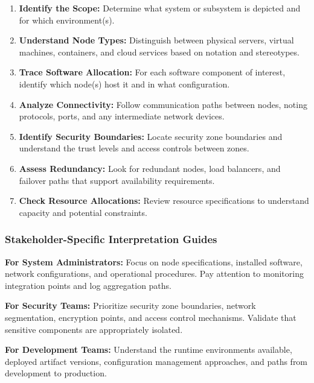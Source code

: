 \documentclass[11pt,letterpaper]{article}
\begin{document}
\begin{enumerate}
    \item \textbf{Identify the Scope:} Determine what system or subsystem is depicted and for which environment(s).
    
    \item \textbf{Understand Node Types:} Distinguish between physical servers, virtual machines, containers, and cloud services based on notation and stereotypes.
    
    \item \textbf{Trace Software Allocation:} For each software component of interest, identify which node(s) host it and in what configuration.
    
    \item \textbf{Analyze Connectivity:} Follow communication paths between nodes, noting protocols, ports, and any intermediate network devices.
    
    \item \textbf{Identify Security Boundaries:} Locate security zone boundaries and understand the trust levels and access controls between zones.
    
    \item \textbf{Assess Redundancy:} Look for redundant nodes, load balancers, and failover paths that support availability requirements.
    
    \item \textbf{Check Resource Allocations:} Review resource specifications to understand capacity and potential constraints.
\end{enumerate}

\subsubsection{Stakeholder-Specific Interpretation Guides}

\textbf{For System Administrators:}
Focus on node specifications, installed software, network configurations, and operational procedures. Pay attention to monitoring integration points and log aggregation paths.

\textbf{For Security Teams:}
Prioritize security zone boundaries, network segmentation, encryption points, and access control mechanisms. Validate that sensitive components are appropriately isolated.

\textbf{For Development Teams:}
Understand the runtime environments available, deployed artifact versions, configuration management approaches, and paths from development to production.
\end{document}
